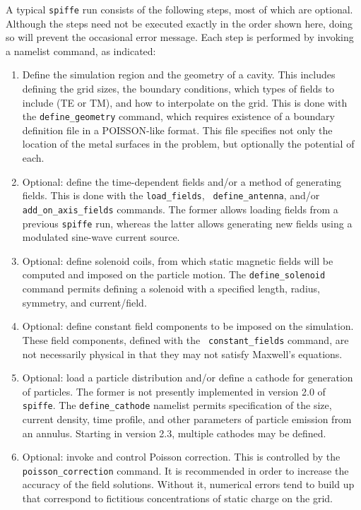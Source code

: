\documentclass[11pt]{article}
\begin{document}
A typical {\tt spiffe} run consists of the following steps, most of
which are optional.  Although the steps need not be executed
exactly in the order shown here, doing so will prevent the 
occasional error message.  Each step is performed by invoking a namelist 
command, as indicated:
\begin{enumerate}

\item Define the simulation region and the geometry of a cavity.  This
includes defining the grid sizes, the boundary conditions, which types
of fields to include (TE or TM), and how to interpolate on the grid.
This is done with the {\tt define\_geometry} command, which requires
existence of a boundary definition file in a POISSON-like format.
This file specifies not only the location of the metal surfaces
in the problem, but optionally the potential of each.

\item Optional: define the time-dependent fields and/or a method of
generating fields.  This is done with the {\tt load\_fields}, {\tt
define\_antenna}, and/or {\tt add\_on\_axis\_fields} commands.  The
former allows loading fields from a previous {\tt spiffe} run, whereas
the latter allows generating new fields using a modulated sine-wave
current source.

\item Optional: define solenoid coils, from which static magnetic
fields will be computed and imposed on the particle motion.
The {\tt define\_solenoid} command permits defining a solenoid
with a specified length, radius, symmetry, and current/field.

\item Optional: define constant field components to be imposed on the
simulation.  These field components, defined with the {\tt
constant\_fields} command, are not necessarily physical in that
they may not satisfy Maxwell's equations.

\item Optional: load a particle distribution and/or define a cathode
for generation of particles.  The former is not presently implemented
in version 2.0 of {\tt spiffe}.  The {\tt define\_cathode} namelist
permits specification of the size, current density, time profile,
and other parameters of particle emission from an annulus.  Starting
in version 2.3, multiple cathodes may be defined.

\item Optional: invoke and control Poisson correction.  This is
controlled by the {\tt poisson\_correction} command.  It is recommended
in order to increase the accuracy of the field solutions.  Without it,
numerical errors tend to build up that correspond to fictitious 
concentrations of static charge on the grid.


\end{enumerate}
\end{document}
